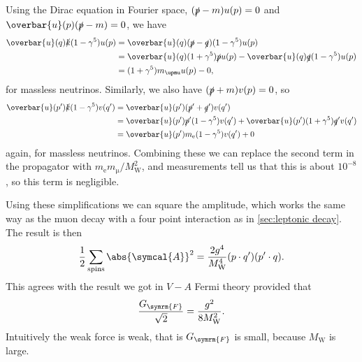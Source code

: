 \documentclass[fleqn]{NotesClass}
\newcommand{\Pparticle}[1]{\mathrm{#1}}
\newcommand{\Pex}{\ensuremath{\Pparticle{e}}}
\newcommand{\Pmux}{\ensuremath{\upmu}}
\newcommand{\PW}{\ensuremath{\Pparticle{W}}}
\newcommand{\diracadjoint}[1]{\overbar{#1}}
\newcommand{\amplitude}{\symcal{A}}
\newcommand{\fermiConst}{G_{\symrm{F}}}
\begin{document}
    Using the Dirac equation in Fourier space, \((\slashed{p} - m)u(p) = 0\) and \(\diracadjoint{u}(p)(\slashed{p} - m) = 0\), we have
    \begin{align}
        \diracadjoint{u}(q)\slashed{k}(1 - \gamma^5)u(p) &= \diracadjoint{u}(q)(\slashed{p} - \slashed{q})(1 - \gamma^5)u(p)\\
        &= \diracadjoint{u}(q)(1 + \gamma^5)\slashed{p}u(p) - \diracadjoint{u}(q)\slashed{q}(1 - \gamma^5)u(p)\\
        &= (1 + \gamma^5)m_{\Pmux} u(p) - 0,
    \end{align}
    for massless neutrinos.
    Similarly, we also have \((\slashed{p} + m)v(p) = 0\), so
    \begin{align}
        \diracadjoint{u}(p')\slashed{k}(1 - \gamma^5)v(q') &= \diracadjoint{u}(p')(\slashed{p}' + \slashed{q}')v(q')\\
        &= \diracadjoint{u}(p')\slashed{p}'(1 - \gamma^5)v(q') + \diracadjoint{u}(p')(1 + \gamma^5)\slashed{q}'v(q')\\
        &= \diracadjoint{u}(p')m_{\Pex}(1 - \gamma^5)v(q') + 0
    \end{align}
    again, for massless neutrinos.
    Combining these we can replace the second term in the propagator with \(m_{\Pex}m_{\Pmux}/M_{\PW}^2\), and measurements tell us that this is about \(10^{-8}\), so this term is negligible.
    
    Using these simplifications we can square the amplitude, which works the same way as the muon decay with a four point interaction as in \cref{sec:leptonic decay}.
    The result is then
    \begin{equation}
        \frac{1}{2}\sum_{\text{spins}} \abs{\amplitude}^2 = \frac{2g^4}{M_{\PW}^4} (p \cdot q')(p' \cdot q).
    \end{equation}
    This agrees with the result we got in \(V - A\) Fermi theory provided that
    \begin{equation}
        \frac{\fermiConst}{\sqrt{2}} = \frac{g^2}{8M_{\PW}^2}.
    \end{equation}
    Intuitively the weak force is weak, that is \(\fermiConst\) is small, because \(M_{\PW}\) is large.
    
\end{document}
